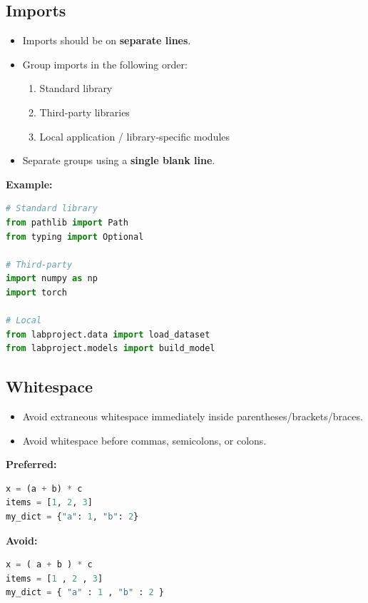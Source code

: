 \documentclass[11pt]{article}
\begin{document}
\subsection{Imports}
\begin{itemize}[label={-},leftmargin=2em,labelsep=0.6em,itemsep=0.2em]
  \item Imports should be on \textbf{separate lines}.
  \item Group imports in the following order:
  \begin{enumerate}[leftmargin=2em,itemsep=0.15em]
    \item Standard library
    \item Third-party libraries
    \item Local application / library-specific modules
  \end{enumerate}
  \item Separate groups using a \textbf{single blank line}.
\end{itemize}

\textbf{Example:}
\begin{lstlisting}[language=Python]
# Standard library
from pathlib import Path
from typing import Optional

# Third-party
import numpy as np
import torch

# Local
from labproject.data import load_dataset
from labproject.models import build_model
\end{lstlisting}

\subsection{Whitespace}
\begin{itemize}[label={-},leftmargin=2em,labelsep=0.6em,itemsep=0.2em]
  \item Avoid extraneous whitespace immediately inside parentheses/brackets/braces.
  \item Avoid whitespace before commas, semicolons, or colons.
\end{itemize}

\textbf{Preferred:}
\begin{lstlisting}[language=Python]
x = (a + b) * c
items = [1, 2, 3]
my_dict = {"a": 1, "b": 2}
\end{lstlisting}

\textbf{Avoid:}
\begin{lstlisting}[language=Python]
x = ( a + b ) * c
items = [1 , 2 , 3]
my_dict = { "a" : 1 , "b" : 2 }
\end{lstlisting}
\end{document}
